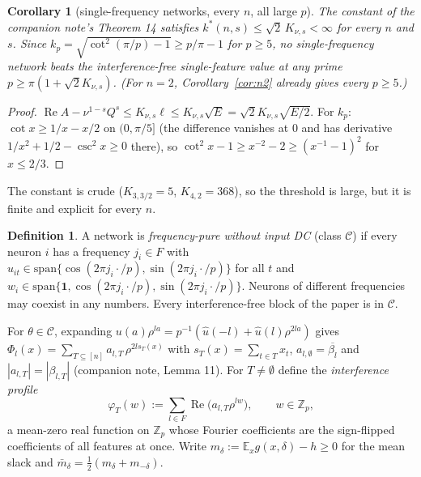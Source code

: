\documentclass[11pt]{article}
\newtheorem{corollary}[theorem]{Corollary}
\theoremstyle{definition}
\newtheorem{definition}[theorem]{Definition}
\renewcommand{\Re}{\operatorname{Re}}
\begin{document}
\begin{corollary}[single-frequency networks, every $n$, all large $p$]\label{cor:largep}
The constant of the companion note's Theorem 14 satisfies $k^*(n,s)\le\sqrt2\,K_{\nu,s}<\infty$ for every $n$ and $s$.
Since $k_p=\sqrt{\cot^2(\pi/p)-1}\ge p/\pi-1$ for $p\ge5$, no single-frequency network beats the interference-free
single-feature value at any prime $p\ge\pi(1+\sqrt2K_{\nu,s})$.  (For $n=2$, Corollary~\ref{cor:n2} already gives every $p\ge5$.)
\end{corollary}
\begin{proof}
$\Re A-\nu^{1-s}Q^s\le K_{\nu,s}\ell\le K_{\nu,s}\sqrt E=\sqrt2K_{\nu,s}\sqrt{E/2}$.  For $k_p$: $\cot x\ge1/x-x/2$ on
$(0,\pi/5]$ (the difference vanishes at $0$ and has derivative $1/x^2+1/2-\csc^2x\ge0$ there), so
$\cot^2x-1\ge x^{-2}-2\ge(x^{-1}-1)^2$ for $x\le2/3$.
\end{proof}
The constant is crude ($K_{3,3/2}=5$, $K_{4,2}=368$), so the threshold is large, but it is finite and explicit for
every $n$.

\begin{definition}
A network is \emph{frequency-pure without input DC} (class $\mathcal C$) if every neuron $i$ has a frequency $j_i\in F$ with
$u_{it}\in\mathrm{span}\{\cos(2\pi j_i\cdot/p),\sin(2\pi j_i\cdot/p)\}$ for all $t$ and
$w_i\in\mathrm{span}\{\mathbf1,\cos(2\pi j_i\cdot/p),\sin(2\pi j_i\cdot/p)\}$.  Neurons of different frequencies may
coexist in any numbers.  Every interference-free block of the paper is in $\mathcal C$.
\end{definition}
For $\theta\in\mathcal C$, expanding $u(a)\rho^{la}=p^{-1}(\hat u(-l)+\hat u(l)\rho^{2la})$ gives
$\Phi_l(x)=\sum_{T\subseteq[n]}a_{l,T}\,\rho^{2l s_T(x)}$ with $s_T(x)=\sum_{t\in T}x_t$, $a_{l,\emptyset}=\overline{\beta_l}$ and
$|a_{l,T}|=|\beta_{l,T}|$ (companion note, Lemma 11).  For $T\ne\emptyset$ define the \emph{interference profile}
\[\varphi_T(w):=\sum_{l\in F}\Re\big(a_{l,T}\rho^{lw}\big),\qquad w\in\mathbb Z_p,\]
a mean-zero real function on $\mathbb Z_p$ whose Fourier coefficients are the sign-flipped coefficients of all features at once.
Write $m_\delta:=\mathbb E_xg(x,\delta)-h\ge0$ for the mean slack and $\bar m_\delta=\frac12(m_\delta+m_{-\delta})$.
\end{document}
